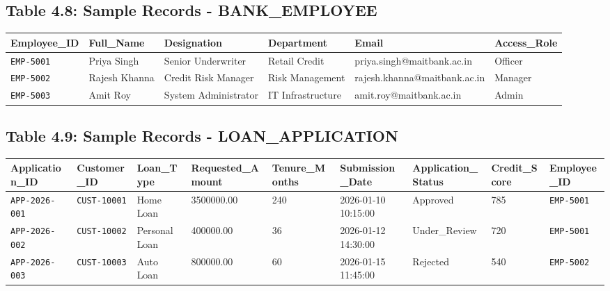 \documentclass[12pt,a4paper,oneside]{report}
\begin{document}
\subsection{Table 4.8: Sample Records - BANK\_EMPLOYEE}

\begin{table}[htbp]
\centering
\small
\begin{tabularx}{\textwidth}{p{2.5cm} X X X X X}
\toprule
\textbf{Employee\_ID} & \textbf{Full\_Name} & \textbf{Designation} & \textbf{Department} & \textbf{Email} & \textbf{Access\_Role} \\
\midrule
\texttt{EMP-5001} & Priya Singh & Senior Underwriter & Retail Credit & priya.singh@maitbank.ac.in & Officer \\
\texttt{EMP-5002} & Rajesh Khanna & Credit Risk Manager & Risk Management & rajesh.khanna@maitbank.ac.in & Manager \\
\texttt{EMP-5003} & Amit Roy & System Administrator & IT Infrastructure & amit.roy@maitbank.ac.in & Admin \\
\bottomrule
\end{tabularx}
\end{table}

\subsection{Table 4.9: Sample Records - LOAN\_APPLICATION}

\begin{table}[htbp]
\centering
\small
\begin{tabularx}{\textwidth}{p{2.5cm} X X X X X X X X}
\toprule
\textbf{Application\_ID} & \textbf{Customer\_ID} & \textbf{Loan\_Type} & \textbf{Requested\_Amount} & \textbf{Tenure\_Months} & \textbf{Submission\_Date} & \textbf{Application\_Status} & \textbf{Credit\_Score} & \textbf{Employee\_ID} \\
\midrule
\texttt{APP-2026-001} & \texttt{CUST-10001} & Home Loan & 3500000.00 & 240 & 2026-01-10 10:15:00 & Approved & 785 & \texttt{EMP-5001} \\
\texttt{APP-2026-002} & \texttt{CUST-10002} & Personal Loan & 400000.00 & 36 & 2026-01-12 14:30:00 & Under\_Review & 720 & \texttt{EMP-5001} \\
\texttt{APP-2026-003} & \texttt{CUST-10003} & Auto Loan & 800000.00 & 60 & 2026-01-15 11:45:00 & Rejected & 540 & \texttt{EMP-5002} \\
\bottomrule
\end{tabularx}
\end{table}
\end{document}
